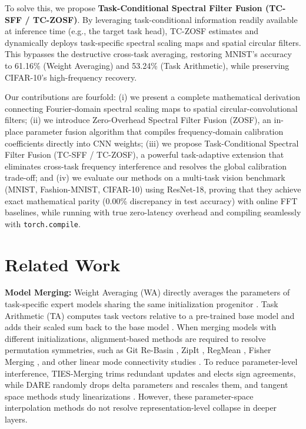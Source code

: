 \documentclass{article}
\theoremstyle{plain}
\theoremstyle{definition}
\theoremstyle{remark}
\begin{document}
To solve this, we propose \textbf{Task-Conditional Spectral Filter Fusion (TC-SFF / TC-ZOSF)}. By leveraging task-conditional information readily available at inference time (e.g., the target task head), TC-ZOSF estimates and dynamically deploys task-specific spectral scaling maps and spatial circular filters. This bypasses the destructive cross-task averaging, restoring MNIST's accuracy to 61.16\% (Weight Averaging) and 53.24\% (Task Arithmetic), while preserving CIFAR-10's high-frequency recovery.

Our contributions are fourfold: (i) we present a complete mathematical derivation connecting Fourier-domain spectral scaling maps to spatial circular-convolutional filters; (ii) we introduce Zero-Overhead Spectral Filter Fusion (ZOSF), an in-place parameter fusion algorithm that compiles frequency-domain calibration coefficients directly into CNN weights; (iii) we propose Task-Conditional Spectral Filter Fusion (TC-SFF / TC-ZOSF), a powerful task-adaptive extension that eliminates cross-task frequency interference and resolves the global calibration trade-off; and (iv) we evaluate our methods on a multi-task vision benchmark (MNIST, Fashion-MNIST, CIFAR-10) using ResNet-18, proving that they achieve exact mathematical parity (0.00\% discrepancy in test accuracy) with online FFT baselines, while running with true zero-latency overhead and compiling seamlessly with \texttt{torch.compile}.

\section{Related Work}
\label{sec:related}

\textbf{Model Merging:} Weight Averaging (WA) directly averages the parameters of task-specific expert models sharing the same initialization progenitor \cite{langley00, neyshabur21what_shared, wortsman22model_soups}. Task Arithmetic (TA) computes task vectors relative to a pre-trained base model and adds their scaled sum back to the base model \cite{ilharco23task_arithmetic}. When merging models with different initializations, alignment-based methods are required to resolve permutation symmetries, such as Git Re-Basin \cite{ainsworth23git_rebasin}, ZipIt \cite{stoica24zipit}, RegMean \cite{jin23regmean}, Fisher Merging \cite{matena22fisher}, and other linear mode connectivity studies \cite{frankle20linear_mode, entezari22role_permutation, choshen22fusing_init}. To reduce parameter-level interference, TIES-Merging \cite{yadav2023ties} trims redundant updates and elects sign agreements, while DARE \cite{yu2024supermario} randomly drops delta parameters and rescales them, and tangent space methods study linearizations \cite{ortiz23task_tangent}. However, these parameter-space interpolation methods do not resolve representation-level collapse in deeper layers.
\end{document}
